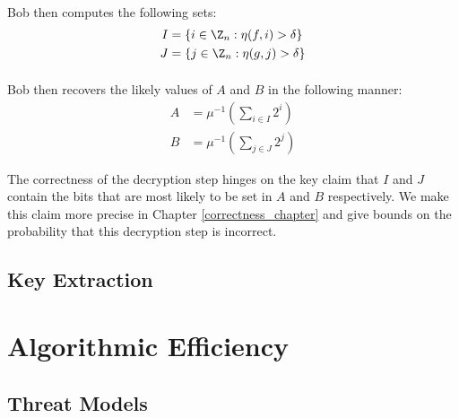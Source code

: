 \paragraph{}
Bob then computes the following sets:
\begin{align*}
I &= \{ i \in \Z_n : \eta(f, i) > \delta  \}\\
J &= \{ j \in \Z_n : \eta(g, j) > \delta  \}
\end{align*}

\paragraph{}
Bob then recovers the likely values of $A$ and $B$ in the following manner:
\begin{align*}
A &= \mu^{-1}(\sum_{i \in I} 2^i)\\
B &= \mu^{-1}(\sum_{j \in J} 2^j)
\end{align*}

The correctness of the decryption step hinges on the key claim that $I$ and $J$ contain the bits that are most likely to be set in $A$ and $B$ respectively. We make this claim more precise in Chapter \ref{correctness_chapter} and give bounds on the probability that this decryption step is incorrect.

\subsection{Key Extraction}

\section{Algorithmic Efficiency}


\subsection{Threat Models}
